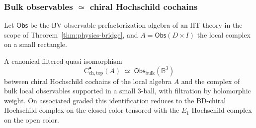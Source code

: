 \subsubsection{\texorpdfstring{Bulk observables $\simeq$ chiral Hochschild cochains}{Bulk observables equivalent to chiral Hochschild cochains}}
\label{subsec:bulk-equals-CHC}
Let $\mathsf{Obs}$ be the BV observable prefactorization algebra of an HT theory in the scope of Theorem~\ref{thm:physics-bridge}, and $A=\mathsf{Obs}(D\times I)$ the local complex on a small rectangle.

\begin{theorem}
\label{thm:bulk-CHC}
A canonical filtered quasi-isomorphism
\[
\mathrm{C}^\bullet_{\mathrm{ch,top}}(A)\;\simeq\;\mathsf{Obs}_{\mathrm{bulk}}(\mathbb{B}^3)
\]
between chiral Hochschild cochains of the local algebra $A$ and the complex of bulk local observables supported in a small $3$-ball, with filtration by holomorphic weight. On associated graded this identification reduces to the BD-chiral Hochschild complex on the closed color tensored with the $E_1$ Hochschild complex on the open color.
\end{theorem}

